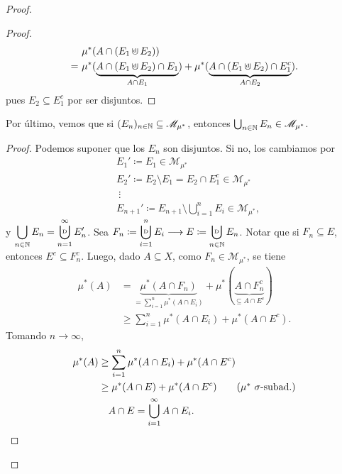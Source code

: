 \begin{proof}
\begin{enumerate}
\begin{proof}
\begin{align*}
				& \mu^{*}(A \cap (E_1 \cupd E_2)) \\
				= \ & \mu^{*}(\underbrace{A \cap (E_1 \cupd E_2) \cap E_1}_{A \cap E_1}) + \mu^{*}(\underbrace{A \cap (E_1 \cupd E_2) \cap E_1^c}_{A \cap E_2}) 
			.\end{align*}
			pues $E_2 \subseteq E_1^c$ por ser disjuntos.
		\end{proof}
		Por último, vemos que si $(E_n)_{n\in\mathbb{N}} \subseteq \mathscr{M}_{\mu^{*}}$, entonces $\bigcup_{n\in\mathbb{N}} E_n \in \mathscr{M}_{\mu^{*}}$.
		\begin{proof}
			Podemos suponer que los $E_n$ son disjuntos. Si no, los cambiamos por
			\begin{align*}
				& E_{1}' \coloneq E_{1} \in \mathscr{M}_{\mu^{*}} \\
				& E_{2}' \coloneq E_{2} \setminus E_{1} = E_2 \cap E_1^c \in \mathscr{M}_{\mu^{*}} \\
				& \ \vdots \\
				& E_{n+1}' \coloneq E_{n+1} \setminus \bigcup_{i=1}^{n} E_i \in \mathscr{M}_{\mu^{*}}
			,\end{align*}
			y $\displaystyle\bigcup_{n\in\N} E_n = \displaystyle\bigcupd_{n=1}^{\infty} E_{n}'$. Sea $F_n \coloneq \displaystyle\bigcupd_{i=1}^{n} E_i \longrightarrow E \coloneq \displaystyle\bigcupd_{n\in\N} E_n$. Notar que si $F_n \subseteq E$, entonces $E^c \subseteq F_{n}^{c}$. Luego, dado $A \subseteq X$, como $F_n \in \mathscr{M}_{\mu^{*}}$, se tiene
			\begin{align*}
				\mu^{*}(A) &= \underbrace{\mu^{*}(A \cap F_n)}_{= \sum_{i=1}^{n} \mu^{*}(A \cap E_i)} + \mu^{*}(\underbrace{A \cap F_{n}^{c}}_{\subseteq A \cap E^c}) \\
				& \geq \sum_{i=1}^{n} \mu^{*}(A \cap E_i) + \mu^{*}(A \cap E^c)
			.\end{align*}
			Tomando $n \to \infty$,
			\begin{align*}
				\mu^{*}(A) & \geq \sum_{i=1}^{n} \mu^{*}(A \cap E_i) + \mu^{*}(A \cap E^c) \\
				& \geq \mu^{*}(A \cap E) + \mu^{*}(A \cap E^c) \tag{$\mu^{*}\ \sigma$-subad.} \\
				& \quad A \cap E = \bigcup_{i=1}^{\infty} A \cap E_i
			.\end{align*}
		\end{proof}
	\end{enumerate}
\end{proof}
